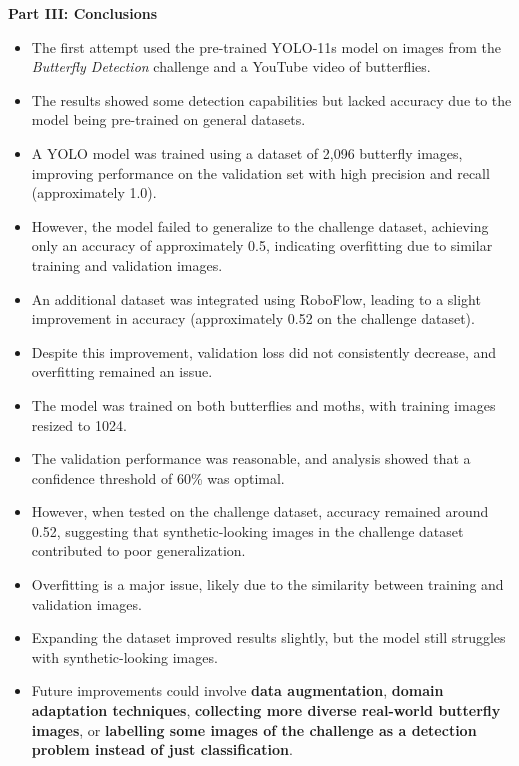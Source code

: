 \documentclass{cpsc202}
\begin{document}
    \centerline{\Large\textbf{Part III: Conclusions}}
    \begin{itemize}
        \item The first attempt used the pre-trained YOLO-11s model on images from the \textit{Butterfly Detection} challenge and a YouTube video of butterflies.
        \item The results showed some detection capabilities but lacked accuracy due to the model being pre-trained on general datasets.
        \item A YOLO model was trained using a dataset of 2,096 butterfly images, improving performance on the validation set with high precision and recall (approximately 1.0).
        \item However, the model failed to generalize to the challenge dataset, achieving only an accuracy of approximately 0.5, indicating overfitting due to similar training and validation images.
        \item An additional dataset was integrated using RoboFlow, leading to a slight improvement in accuracy (approximately 0.52 on the challenge dataset).
        \item Despite this improvement, validation loss did not consistently decrease, and overfitting remained an issue.
        \item The model was trained on both butterflies and moths, with training images resized to 1024.
        \item The validation performance was reasonable, and analysis showed that a confidence threshold of 60\% was optimal.
        \item However, when tested on the challenge dataset, accuracy remained around 0.52, suggesting that synthetic-looking images in the challenge dataset contributed to poor generalization.
        \item Overfitting is a major issue, likely due to the similarity between training and validation images.
        \item Expanding the dataset improved results slightly, but the model still struggles with synthetic-looking images.
        \item Future improvements could involve \textbf{data augmentation}, \textbf{domain adaptation techniques}, \textbf{collecting more diverse real-world butterfly images}, or \textbf{labelling some images of the challenge as a detection problem instead of just classification}.
    \end{itemize}
\end{document}
